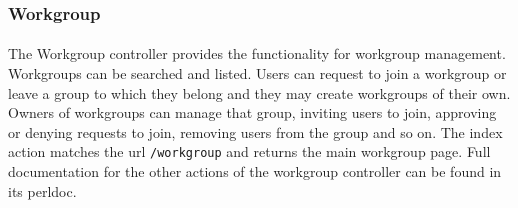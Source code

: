 \subsubsection{Workgroup}
\label{sec:controller_workgroup}
\paragraph{}
The Workgroup controller provides the functionality for workgroup management. Workgroups can be searched and listed. Users can request to join a workgroup or leave a group to which they belong and they may create workgroups of their own. Owners of workgroups can manage that group, inviting users to join, approving or denying requests to join, removing users from the group and so on. The index action matches the url \texttt{/workgroup} and returns the main workgroup page. Full documentation for the other actions of the workgroup controller can be found in its perldoc.
% 
% 
